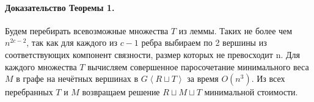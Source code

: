 \paragraph{Доказательство Теоремы 1.}
Будем перебирать всевозможные множества $T$ из леммы. Таких не более чем $n^{2c−2}$, так как для каждого из $c-1$ ребра выбираем по 2 вершины из соответствующих компонент связности, размер которых не превосходит n. Для каждого множества $T$ вычисляем совершенное паросочетание минимального веса $M$ в графе на нечётных вершинах в $G \left\langle R \sqcup T \right\rangle$ за время $O(n^3)$. Из всех перебранных $T$ и $M$ возвращаем решение $R \sqcup M \sqcup T$ минимальной стоимости.